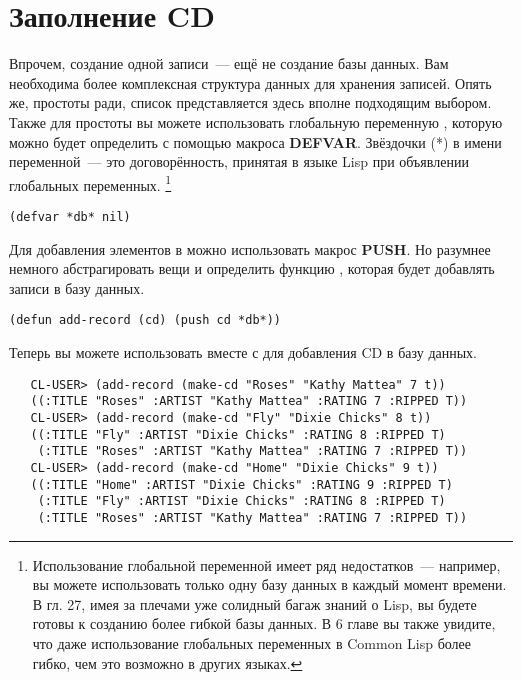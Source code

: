 \section{Заполнение CD}

Впрочем, создание одной записи~--- ещё не создание базы данных. Вам необходима более
комплексная структура данных для хранения записей. Опять же, простоты ради, список
представляется здесь вполне подходящим выбором. Также для простоты вы можете использовать
глобальную переменную , которую можно будет определить с помощью макроса
\textbf{DEFVAR}. Звёздочки (*) в имени переменной~--- это договорённость, принятая в языке
Lisp при объявлении глобальных переменных. \footnote{Использование глобальной переменной
  имеет ряд недостатков~--- например, вы можете использовать только одну базу данных в
  каждый момент времени. В гл. 27, имея за плечами уже солидный багаж знаний о Lisp, вы
  будете готовы к созданию более гибкой базы данных. В 6 главе вы также увидите, что даже
  использование глобальных переменных в Common Lisp более гибко, чем это возможно в других
  языках.}

\begin{lstlisting}
(defvar *db* nil)
\end{lstlisting}

Для добавления элементов в  можно использовать макрос \textbf{PUSH}. Но
разумнее немного абстрагировать вещи и определить функцию , которая будет
добавлять записи в базу данных.

\begin{lstlisting}
(defun add-record (cd) (push cd *db*))
\end{lstlisting}

Теперь вы можете использовать  вместе с  для добавления CD
в базу данных.

\begin{verbatim}
   CL-USER> (add-record (make-cd "Roses" "Kathy Mattea" 7 t))
   ((:TITLE "Roses" :ARTIST "Kathy Mattea" :RATING 7 :RIPPED T))
   CL-USER> (add-record (make-cd "Fly" "Dixie Chicks" 8 t))
   ((:TITLE "Fly" :ARTIST "Dixie Chicks" :RATING 8 :RIPPED T)
    (:TITLE "Roses" :ARTIST "Kathy Mattea" :RATING 7 :RIPPED T))
   CL-USER> (add-record (make-cd "Home" "Dixie Chicks" 9 t))
   ((:TITLE "Home" :ARTIST "Dixie Chicks" :RATING 9 :RIPPED T)
    (:TITLE "Fly" :ARTIST "Dixie Chicks" :RATING 8 :RIPPED T)
    (:TITLE "Roses" :ARTIST "Kathy Mattea" :RATING 7 :RIPPED T))
\end{verbatim}

